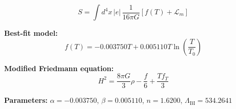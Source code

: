 
\begin{equation}
  S = \int d^4x \, |e| \, \frac{1}{16\pi G} \left[ f(T) + \mathcal{L}_m \right]
\end{equation}

\textbf{Best-fit model:}
\begin{equation}
  f(T) = -0.003750 T + 0.005110 T \ln\!\left(\frac{T}{T_0}\right)
\end{equation}

\textbf{Modified Friedmann equation:}
\begin{equation}
  H^2 = \frac{8\pi G}{3} \rho - \frac{f}{6} + \frac{T f_T}{3}
\end{equation}

\textbf{Parameters:}
$\alpha = -0.003750$, \quad
$\beta = 0.005110$, \quad
$n = 1.6200$, \quad
$\Lambda_{\text{BI}} = 534.2641$